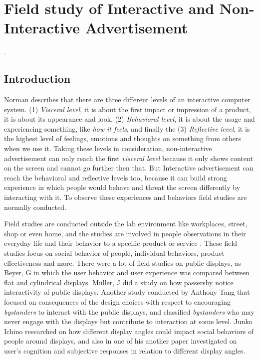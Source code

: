 \chapter{Field study of Interactive and Non-Interactive Advertisement} %

\label{Chapter8} %
\newpage
.
\newpage

\section{Introduction}
Norman \cite{norman} describes that there are three different levels of an interactive computer system. (1) \emph{Visceral level}, it is about the first impact or impression of a product, it is about its appearance and look, (2) \emph{Behavioral level}, it is about the usage and experiencing something, like \emph{how it feels}, and finally the (3) \emph{Reflective level}, it is the highest level of feelings, emotions and thoughts on something from others when we use it. Taking these levels in consideration, non-interactive advertisement can only reach the first \emph{visceral level} because it only shows content on the screen and cannot go further then that. But Interactive advertisement can reach the behavioral and reflective levels too, because it can build strong experience in which people would behave and threat the screen differently by interacting with it. To observe these experiences and behaviors field studies are normally conducted.

Field studies are conducted outside the lab environment like workplaces, street, shop or even home, and the studies are involved in people observations in their everyday life and their behavior to a specific product or service \cite{field_study}. These field studies focus on social behavior of people, individual behaviors, product effectiveness and more. There were a lot of field studies on public displays, as Beyer, G \cite{CylindricalScreen} in which the user behavior and user experience was compared between flat and cylindrical displays. Müller, J \cite{LookingGlass} did a study on how passersby notice interactivity of public displays. Another study conducted by Anthony Tang \cite{Bystanders} that focused on consequences of the design choices with respect to encouraging \emph{bystanders} to interact with the public displays, and classified \emph{bystanders} who may never engage with the displays but contribute to interaction at some level. Junko Ichino \cite{DisplayAngleEffect} researched on how different display angles could impact social behaviors of people around displays, and also in one of his another paper \cite{DisplayAngleEffect2} investigated on user's cognition and subjective responses in relation to different display angles.

